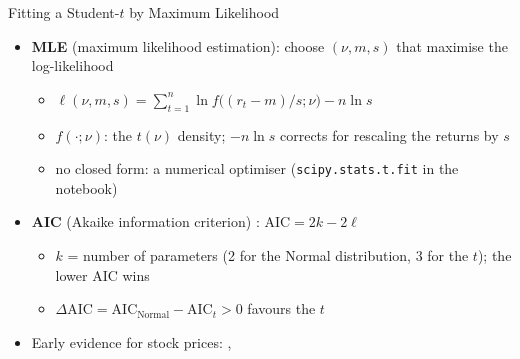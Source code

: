 \begin{frame}{Fitting a Student-$t$ by Maximum Likelihood}
\itemsize{\small}
\begin{itemize}
    \item \textbf{MLE} (maximum likelihood estimation): choose $(\nu, m, s)$ that maximise the log-likelihood
    \begin{itemize}
        \item $\ell(\nu, m, s) = \sum_{t=1}^n \ln f\big((r_t - m)/s; \nu\big) - n \ln s$
        \item $f(\cdot; \nu)$: the $t(\nu)$ density; $-n \ln s$ corrects for rescaling the returns by $s$
        \item no closed form: a numerical optimiser (\texttt{scipy.stats.t.fit} in the notebook)
    \end{itemize}
    \item \textbf{AIC} (Akaike information criterion) : $\text{AIC} = 2k - 2\ell$
    \begin{itemize}
        \item $k$ = number of parameters (2 for the Normal distribution, 3 for the $t$); the lower AIC wins
        \item $\Delta\text{AIC} = \text{AIC}_{\text{Normal}} - \text{AIC}_{t} > 0$ favours the $t$
    \end{itemize}
    \item Early evidence for stock prices: , 
\end{itemize}
\end{frame}

